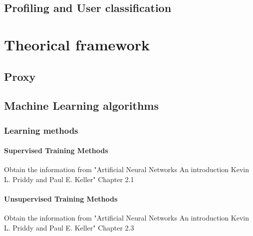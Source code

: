 \documentclass{article}
\begin{document}
\subsection{Profiling  and User classification} %






\section{Theorical framework} %

\subsection{Proxy} %

\subsection{Machine Learning algorithms}	 %

\subsubsection{Learning methods} %

\paragraph{Supervised Training Methods} %
Obtain the information from "Artificial Neural Networks An introduction Kevin L. Priddy and Paul E. Keller" Chapter 2.1

\paragraph{Unsupervised Training Methods} %
Obtain the information from "Artificial Neural Networks An introduction Kevin L. Priddy and Paul E. Keller" Chapter 2.3
\end{document}
